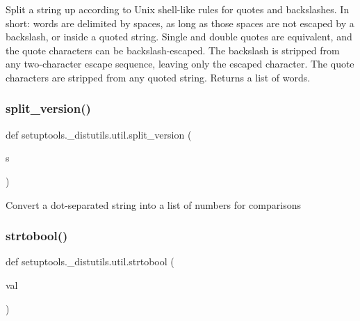 \begin{DoxyVerb}Split a string up according to Unix shell-like rules for quotes and
backslashes.  In short: words are delimited by spaces, as long as those
spaces are not escaped by a backslash, or inside a quoted string.
Single and double quotes are equivalent, and the quote characters can
be backslash-escaped.  The backslash is stripped from any two-character
escape sequence, leaving only the escaped character.  The quote
characters are stripped from any quoted string.  Returns a list of
words.
\end{DoxyVerb}
 \mbox{\label{namespacesetuptools_1_1__distutils_1_1util_a17cc9a66d4d95712cc1647c555ee73d3}} 
\subsubsection{\texorpdfstring{split\+\_\+version()}{split\_version()}}
{\footnotesize\ttfamily def setuptools.\+\_\+distutils.\+util.\+split\+\_\+version (\begin{DoxyParamCaption}\item[{}]{s }\end{DoxyParamCaption})}

\begin{DoxyVerb}Convert a dot-separated string into a list of numbers for comparisons\end{DoxyVerb}
 \mbox{\label{namespacesetuptools_1_1__distutils_1_1util_ae3c52ad8b869bc1f322a20859bb1a9a5}} 
\subsubsection{\texorpdfstring{strtobool()}{strtobool()}}
{\footnotesize\ttfamily def setuptools.\+\_\+distutils.\+util.\+strtobool (\begin{DoxyParamCaption}\item[{}]{val }\end{DoxyParamCaption})}

